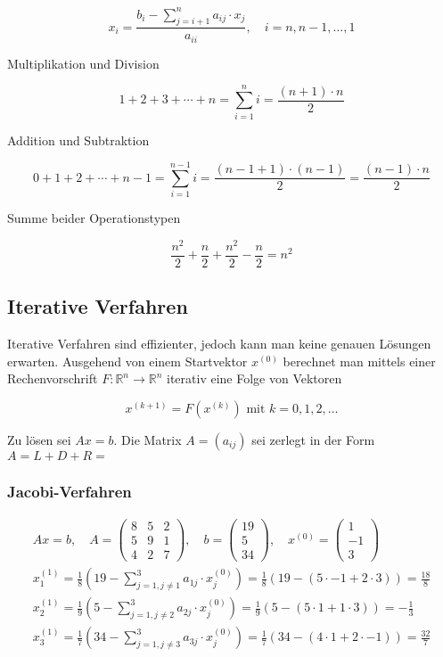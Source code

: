 $$
x_{i}=\frac{b_{i}-\sum_{j=i+1}^{n} a_{i j} \cdot x_{j}}{a_{i i}}, \quad i=n, n-1, \ldots, 1
$$

Multiplikation und Division

$$
1+2+3+\cdots+n=\sum_{i=1}^{n} i=\frac{(n+1) \cdot n}{2}
$$

Addition und Subtraktion

$$
0+1+2+\cdots+n-1=\sum_{i=1}^{n-1} i=\frac{(n-1+1) \cdot(n-1)}{2}=\frac{(n-1) \cdot n}{2}
$$

Summe beider Operationstypen

$$
\frac{n^{2}}{2}+\frac{n}{2}+\frac{n^{2}}{2}-\frac{n}{2}=n^{2}
$$

\subsection{Iterative Verfahren}

Iterative Verfahren sind effizienter, jedoch kann man keine genauen Lösungen erwarten. Ausgehend von einem Startvektor $x^{(0)}$ berechnet man mittels einer Rechenvorschrift $F: \mathbb{R}^{n} \rightarrow \mathbb{R}^{n}$ iterativ eine Folge von Vektoren

$$
x^{(k+1)}=F\left(x^{(k)}\right) \text { mit } k=0,1,2, \ldots
$$

Zu lösen sei $A x=b$. Die Matrix $A=\left(a_{i j}\right)$ sei zerlegt in der Form $A=L+D+R=$

\subsubsection{Jacobi-Verfahren}

$$
\begin{gathered}
A x=b, \quad A=\left(\begin{array}{lll}
8 & 5 & 2 \\
5 & 9 & 1 \\
4 & 2 & 7
\end{array}\right), \quad b=\left(\begin{array}{c}
19 \\
5 \\
34
\end{array}\right), \quad x^{(0)}=\left(\begin{array}{c}
1 \\
-1 \\
3
\end{array}\right) \\
x_{1}^{(1)}=\frac{1}{8}\left(19-\sum_{j=1, j \neq 1}^{3} a_{1 j} \cdot x_{j}^{(0)}\right)=\frac{1}{8}(19-(5 \cdot-1+2 \cdot 3))=\frac{18}{8} \\
x_{2}^{(1)}=\frac{1}{9}\left(5-\sum_{j=1, j \neq 2}^{3} a_{2 j} \cdot x_{j}^{(0)}\right)=\frac{1}{9}(5-(5 \cdot 1+1 \cdot 3))=-\frac{1}{3} \\
x_{3}^{(1)}=\frac{1}{7}\left(34-\sum_{j=1, j \neq 3}^{3} a_{3 j} \cdot x_{j}^{(0)}\right)=\frac{1}{7}(34-(4 \cdot 1+2 \cdot-1))=\frac{32}{7}
\end{gathered}
$$

